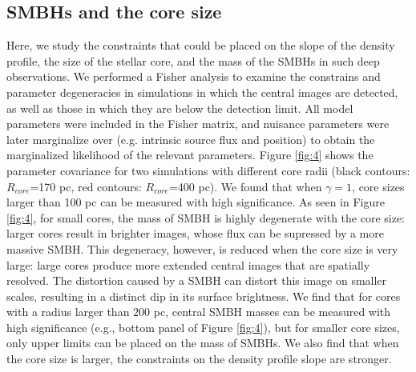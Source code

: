 \documentclass[chicago]{emulateapj}
\begin{document}
\subsection{SMBHs and the core size}
Here, we study the constraints that could be placed on the slope of the density profile, the size of the stellar core, and the mass of the SMBHs in such deep observations. 
We performed a Fisher analysis to examine the constrains and parameter degeneracies in simulations in which the central images are detected, as well as those in which they are below the detection limit. All model parameters were included in the Fisher matrix, and nuisance parameters were later marginalize over (e.g. intrinsic source flux and position) to obtain the marginalized likelihood of the relevant parameters.  
 Figure \ref{fig:4} shows the parameter covariance for two simulations with different core radii (black contours:  $R_{core}$=170 pc, red contours: $R_{core}$=400 pc).
We found that when $\gamma=1$, core sizes larger than 100 pc can be measured with high significance. As seen in Figure \ref{fig:4}, 
for small cores, the mass of SMBH is highly degenerate with the core size: larger cores result in brighter images, whose flux can be supressed by a more massive SMBH.
This degeneracy,  however,  is reduced when the core size is very large: large cores produce more extended central images that are spatially resolved. The distortion caused by a SMBH can distort this image on smaller scales, resulting in a distinct dip in its surface brightness. %
We find that for cores with a radius larger than $200$ pc, central SMBH masses can be measured with high significance (e.g., bottom panel of Figure \ref{fig:4}), but for smaller core sizes, only upper limits can be placed on the mass of SMBHs.
We also find that when the core size is larger, the constraints on the density profile slope are stronger.

\end{document}

